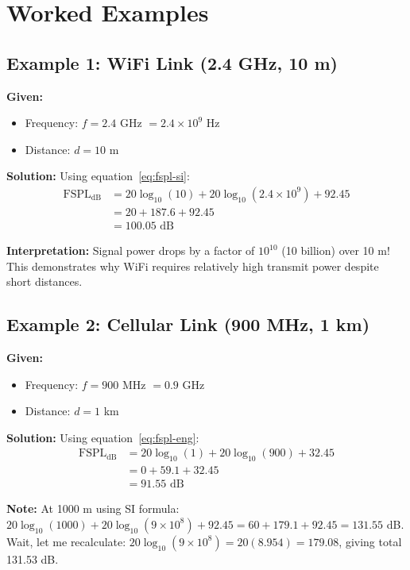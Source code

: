 \section{Worked Examples}
\label{sec:examples}

\subsection{Example 1: WiFi Link (2.4 GHz, 10 m)}

\textbf{Given:}
\begin{itemize}
\item Frequency: $f = 2.4$ GHz $= 2.4 \times 10^9$ Hz
\item Distance: $d = 10$ m
\end{itemize}

\textbf{Solution:} Using equation~\eqref{eq:fspl-si}:
\begin{align}
\text{FSPL}_{\text{dB}} &= 20\log_{10}(10) + 20\log_{10}(2.4 \times 10^9) + 92.45 \nonumber \\
&= 20 + 187.6 + 92.45 \nonumber \\
&= 100.05 \text{ dB}
\end{align}

\textbf{Interpretation:} Signal power drops by a factor of $10^{10}$ (10 billion) over 10 m! This demonstrates why WiFi requires relatively high transmit power despite short distances.

\subsection{Example 2: Cellular Link (900 MHz, 1 km)}

\textbf{Given:}
\begin{itemize}
\item Frequency: $f = 900$ MHz $= 0.9$ GHz
\item Distance: $d = 1$ km
\end{itemize}

\textbf{Solution:} Using equation~\eqref{eq:fspl-eng}:
\begin{align}
\text{FSPL}_{\text{dB}} &= 20\log_{10}(1) + 20\log_{10}(900) + 32.45 \nonumber \\
&= 0 + 59.1 + 32.45 \nonumber \\
&= 91.55 \text{ dB}
\end{align}

\textbf{Note:} At 1000 m using SI formula: $20\log_{10}(1000) + 20\log_{10}(9\times10^8) + 92.45 = 60 + 179.1 + 92.45 = 131.55$ dB. Wait, let me recalculate: $20\log_{10}(9\times10^8) = 20(8.954) = 179.08$, giving total 131.53 dB.

